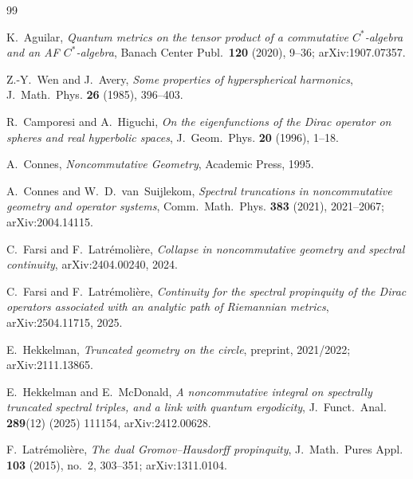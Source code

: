 \documentclass[11pt,a4paper]{article}
\theoremstyle{plain}
\theoremstyle{definition}
\begin{document}

\begin{thebibliography}{99}

K.~Aguilar,
\newblock \emph{Quantum metrics on the tensor product of a commutative
$C^{*}$-algebra and an AF $C^{*}$-algebra},
\newblock Banach Center Publ.~\textbf{120} (2020), 9--36;
\newblock arXiv:1907.07357.

Z.-Y.~Wen and J.~Avery,
\newblock \emph{Some properties of hyperspherical harmonics},
\newblock J.~Math.~Phys. \textbf{26} (1985), 396--403.

R.~Camporesi and A.~Higuchi,
\newblock \emph{On the eigenfunctions of the Dirac operator on
spheres and real hyperbolic spaces},
\newblock J.~Geom.~Phys. \textbf{20} (1996), 1--18.

A.~Connes,
\newblock \emph{Noncommutative Geometry},
\newblock Academic Press, 1995.

A.~Connes and W.~D.~van~Suijlekom,
\newblock \emph{Spectral truncations in noncommutative geometry and
operator systems},
\newblock Comm.~Math.~Phys. \textbf{383} (2021), 2021--2067;
\newblock arXiv:2004.14115.

C.~Farsi and F.~Latr\'emoli\`ere,
\newblock \emph{Collapse in noncommutative geometry and spectral
continuity},
\newblock arXiv:2404.00240, 2024.

C.~Farsi and F.~Latr\'emoli\`ere,
\newblock \emph{Continuity for the spectral propinquity of the Dirac
operators associated with an analytic path of Riemannian metrics},
\newblock arXiv:2504.11715, 2025.

E.~Hekkelman,
\newblock \emph{Truncated geometry on the circle},
\newblock preprint, 2021/2022; arXiv:2111.13865.

E.~Hekkelman and E.~McDonald,
\newblock \emph{A noncommutative integral on spectrally truncated
spectral triples, and a link with quantum ergodicity},
\newblock J.~Funct.~Anal. \textbf{289}(12) (2025) 111154, arXiv:2412.00628.

F.~Latr\'emoli\`ere,
\newblock \emph{The dual Gromov--Hausdorff propinquity},
\newblock J.~Math.~Pures Appl. \textbf{103} (2015), no.~2, 303--351;
\newblock arXiv:1311.0104.


\end{thebibliography}
\end{document}
